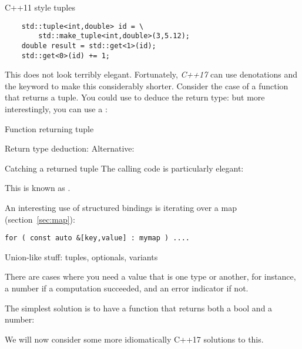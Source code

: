 \lstset{style=reviewcode,language=C++}
\begin{block}{C++11 style tuples}
  \label{sl:tuple11}
  \begin{lstlisting}
    std::tuple<int,double> id = \
        std::make_tuple<int,double>(3,5.12);
    double result = std::get<1>(id);
    std::get<0>(id) += 1;
  \end{lstlisting}
\end{block}

This does not look terribly elegant. Fortunately,
\emph{C++17} can use denotations and the 
keyword to make this considerably shorter. Consider the case of a
function that returns a tuple. You could use \n{auto} to deduce the
return type:
%
%
but more interestingly, you can use a
:
%

\begin{slide}{Function returning tuple}
  \label{sl:tuplefun}
  \begin{multicols}{2}
    Return type deduction:
    \columnbreak
    Alternative:
  \end{multicols}
\end{slide}

\begin{block}{Catching a returned tuple}
  \label{sl:catch-tuple}
  The calling code is particularly elegant:

  This is known as .
\end{block}

An interesting use of structured bindings is iterating over a map (section~\ref{sec:map}):
\begin{lstlisting}
for ( const auto &[key,value] : mymap ) ....
\end{lstlisting}

 {Union-like stuff: tuples, optionals, variants}

There are cases where you need a value that is one type or another,
for instance, a number if a computation succeeded, and an error
indicator if not.

The simplest solution is to have a function that returns both a bool
and a number:
%

We will now consider some more idiomatically C++17 solutions to this.

